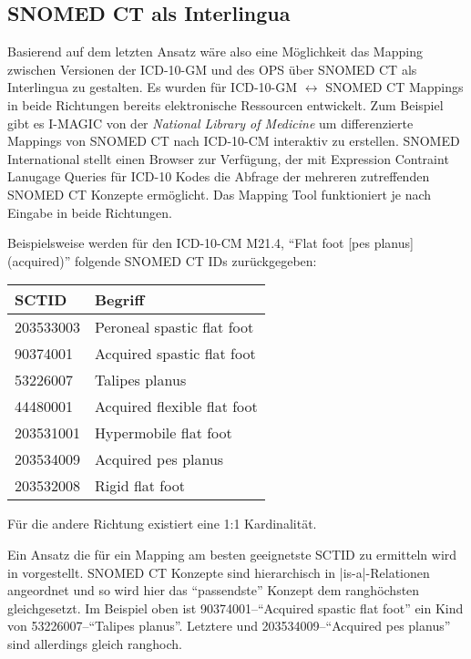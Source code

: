 \subsection{SNOMED CT als Interlingua}

Basierend auf dem letzten Ansatz wäre also eine Möglichkeit das Mapping zwischen Versionen der ICD-10-GM und des OPS über SNOMED CT als Interlingua zu gestalten. Es wurden für ICD-10-GM $\leftrightarrow$ SNOMED CT Mappings in beide Richtungen bereits elektronische Ressourcen entwickelt. Zum Beispiel gibt es I-MAGIC  von der \emph{National Library of Medicine} \cite{i-magic} um differenzierte Mappings von SNOMED CT nach ICD-10-CM interaktiv zu erstellen. SNOMED International stellt einen Browser \cite{snomed-browser} zur Verfügung, der mit Expression Contraint Lanugage Queries für ICD-10 Kodes die Abfrage der mehreren zutreffenden SNOMED CT Konzepte ermöglicht. Das Mapping Tool \cite{snomed-map} funktioniert je nach Eingabe in beide Richtungen. 

Beispielsweise werden für den ICD-10-CM M21.4, "`Flat foot [pes planus] (acquired)"' folgende SNOMED CT IDs zurückgegeben:

{
\renewcommand{\arraystretch}{1.2}
\begin{tabular}{ll}
SCTID & Begriff \\
\hline
203533003 & Peroneal spastic flat foot \\
90374001 & Acquired spastic flat foot \\
53226007 & Talipes planus \\
44480001 & Acquired flexible flat foot \\
203531001 & Hypermobile flat foot \\
203534009 & Acquired pes planus \\
203532008 & Rigid flat foot \\
\end{tabular}
}

Für die andere Richtung existiert eine 1:1 Kardinalität. \cite{WHO-FIC}

Ein Ansatz die für ein Mapping am besten geeignetste SCTID zu ermitteln wird in \cite{icd10-to-snomed} vorgestellt. SNOMED CT Konzepte sind hierarchisch in |is-a|-Relationen angeordnet und so wird hier das "`passendste"' Konzept dem  ranghöchsten gleichgesetzt. Im Beispiel oben ist 90374001--"`Acquired spastic flat foot"' ein Kind von 53226007--"`Talipes planus"'. Letztere und 203534009--"`Acquired pes planus"' sind allerdings gleich ranghoch. 

